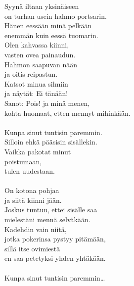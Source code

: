 
        Syynä iltaan yksinäiseen \\
        on turhan usein hahmo portsarin. \\
        Hänen eessään minä pelkään \\
        enemmän kuin eessä tuomarin. \\
        Olen kahvassa kiinni, \\
        vasten ovea painaudun. \\
        Hahmon saapuvan nään \\
        ja oitis reipastun. \\
        Katsot minua silmiin \\
        ja näytät: Ei tänään! \\
        Sanot: Pois! ja minä menen, \\
        kohta huomaat, etten mennyt mihinkään. \\
\hspace{10mm} \\
        Kunpa sinut tuntisin paremmin. \\
        Silloin ehkä pääsisin sisällekin. \\
        Vaikka pakotat minut \\
        poistumaan, \\
        tulen uudestaan. \\
\hspace{10mm} \\
        On kotona pohjaa \\
        ja siitä kiinni jään. \\
        Joskus tuntuu, ettei sisälle saa \\
        mielestäni mennä selväkään. \\
        Kadehdin vain niitä, \\
        jotka pokerinsa pystyy pitämään, \\
        sillä itse ovimiestä \\
        en saa petetyksi yhden yhtäkään. \\
\hspace{10mm} \\
        Kunpa sinut tuntisin paremmin… \\
